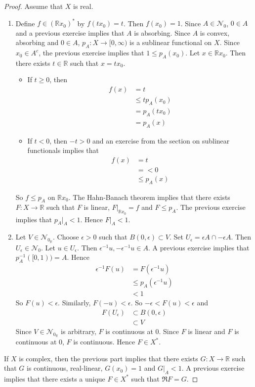 \documentclass[12pt]{amsart}
\theoremstyle{definition}
\newcommand{\ep}{\epsilon}
\newcommand{\R}{\mathbb{R}}
\newcommand{\MN}{\mathcal{N}}
\begin{document}
	\begin{proof} Assume that $X$ is real.
		\begin{enumerate}
			\item Define $f \in (\R x_0)^*$ by $f(tx_0) = t$. Then $f(x_0) = 1$. Since $A \in \MN_0$, $0 \in A$ and a previous exercise implies that $A$ is absorbing. Since $A$ is convex, absorbing and $0 \in A$, $p_A:X \rightarrow [0, \infty)$ is a sublinear functional on $X$. Since $x_0 \in A^c$, the previous exercise implies that $1 \leq p_A(x_0)$. Let $x \in \R x_0$. Then there exists $t \in \R$ such that $x = tx_0$. 
			\begin{itemize}
				\item If $t \geq 0$, then 
				\begin{align*}
					f(x)
					&= t \\
					&\leq tp_A(x_0) \\
					&= p_A(tx_0) \\
					&= p_A(x)
				\end{align*}
				\item If $t<0$, then $-t >0$ and an exercise from the section on sublinear functionals implies that
				\begin{align*}
					f(x)
					&= t \\
					&= < 0 \\
					& \leq p_A(x)
				\end{align*}
			\end{itemize}
				So $f \leq p_A$ on $\R x_0$. The Hahn-Banach theorem implies that there exists $F:X \rightarrow \R$ such that $F$ is linear, $F|_{\R x_0} = f$ and $F \leq p_A$. The previous exercise implies that  $p_A|_A < 1$. Hence $F|_A < 1$. 
		\item Let $V \in \MN_{0_\R}$. Choose $\ep >0$ such that $B(0,\ep) \subset V$. Set $U_{\ep} = \ep A \cap -\ep A$. Then $U_{\ep} \in \MN_0$. Let $u \in U_{\ep}$. Then $\ep^{-1}u, -\ep^{-1}u \in A$. A previous exercise implies that $p_A^{-1}([0,1)) = A$. Hence 
		\begin{align*}
			\ep^{-1}F(u)
			&= F(\ep^{-1}u) \\
			&\leq p_A(\ep^{-1} u) \\
			&< 1
		\end{align*}
		So $F(u) < \ep$. Similarly, $F(-u) < \ep$. So $-\ep < F(u) < \ep$ and
		\begin{align*}
			F(U_{\ep}) 
			&\subset B(0, \ep) \\
			& \subset V 
		\end{align*}
		Since $V \in \MN_{0_{\R}}$ is arbitrary, $F$ is continuous at $0$. Since $F$ is linear and $F$ is continuous at $0$, $F$ is continuous. Hence $F \in X^*$.
		\end{enumerate}
	If $X$ is complex, then the previous part implies that there exists $G:X \rightarrow \R$ such that $G$ is continuous, real-linear, $G(x_0) = 1$ and $G|_A < 1$. A previous exercise implies that there exists a unique $F \in X^*$ such that $\Re F = G$.
	\end{proof}
\end{document}
